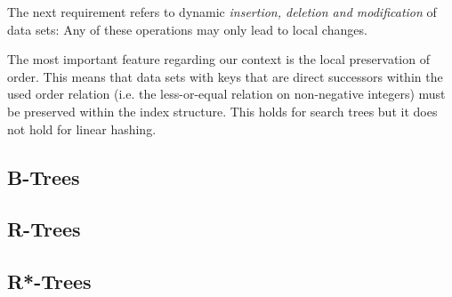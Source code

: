 The next requirement refers to dynamic \textit{insertion, deletion and modification} of data sets: Any of these operations may only lead to local changes. %

The most important feature regarding our context is the local preservation of order. This means that data sets with keys that are direct successors within the used order relation (i.e. the less-or-equal relation on non-negative integers) must be preserved within the index structure. This holds for search trees but it does not hold for linear hashing. 

\cite{Ottmann2012}
\subsection{B-Trees}	
\cite{Knuth1998}	
\subsection{R-Trees}
\subsection{R*-Trees}

